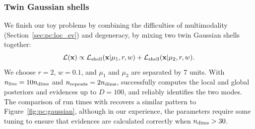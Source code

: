 \subsubsection{Twin Gaussian shells}
We finish our toy problems by combining the difficulties of multimodality (Section~\ref{sec:pc:loc_ev}) and degeneracy, by mixing two twin Gaussian shells together:
\begin{equation}
  \mathcal{L}(\mathbf{x}) \propto \mathcal{L}_{\mathrm{shell}}(\mathbf{x}|\mathbf{\mu}_1,r,w) + \mathcal{L}_{\mathrm{shell}}(\mathbf{x}|\mathbf{\mu}_2,r,w).
  \label{eqn:pc:gaussian_shells}
\end{equation}
We choose \(r=2\), \(w=0.1\), and \(\mu_1\) and \(\mu_2\) are separated by \(7\) units. With \(n_{\mathrm{live}}=10n_{\mathrm{dims}}\) and \(n_{\mathrm{repeats}}=2n_{\mathrm{dims}}\), \PolyChord{} successfully computes the local and global posteriors and evidences up to \(D=100\), and reliably identifies the two modes. The comparison of run times with \MultiNest{} recovers a similar pattern to Figure~\ref{fig:pc:gaussian}, although in our experience, the \MultiNest{} parameters require some tuning to ensure that evidences are calculated correctly when \(n_{\mathrm{dims}}>30\).


\subsection{\CosmoChord}
\label{sec:pc:cosmochord}

